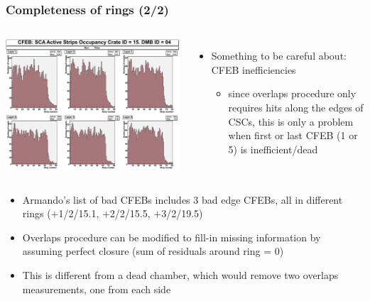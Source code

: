 \documentclass[compress]{beamer}
\begin{document}
\begin{frame}
\frametitle{Completeness of rings (2/2)}

\vspace{0.5 cm}
\begin{columns}
\includegraphics[width=\linewidth]{armando_CFEB5.png}

\begin{itemize}
\item Something to be careful about: CFEB inefficiencies
\begin{itemize}
\item since overlaps procedure only requires hits along the edges of CSCs, this is only a problem when first or last CFEB (1 or 5) is inefficient/dead
\end{itemize}
\end{itemize}
\end{columns}

\vspace{0.2 cm}
\begin{itemize}
\item Armando's list of bad CFEBs includes 3 bad edge CFEBs, all in different rings {\scriptsize ($+$1/2/15.1, $+$2/2/15.5, $+$3/2/19.5)}
\item Overlaps procedure can be modified to fill-in missing information by assuming perfect closure (sum of residuals around ring = 0)
\item This is different from a dead chamber, which would remove two overlaps measurements, one from each side
\end{itemize}
\end{frame}
\end{document}
